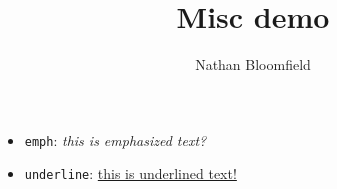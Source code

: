 \documentclass{ximera}
\title{Misc demo}
\author{Nathan Bloomfield}
\begin{document}
\maketitle

\begin{itemize}
\item \texttt{emph}: \emph{this is emphasized text?}
\item \texttt{underline}: \underline{this is underlined text!}
\end{itemize}
\end{document}
